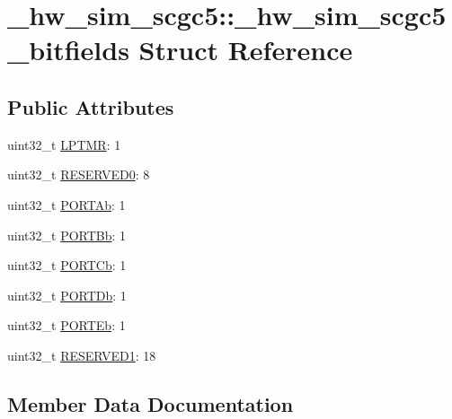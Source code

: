 \hypertarget{struct__hw__sim__scgc5_1_1__hw__sim__scgc5__bitfields}{}\section{\+\_\+hw\+\_\+sim\+\_\+scgc5\+:\+:\+\_\+hw\+\_\+sim\+\_\+scgc5\+\_\+bitfields Struct Reference}
\label{struct__hw__sim__scgc5_1_1__hw__sim__scgc5__bitfields}
\subsection*{Public Attributes}
\begin{DoxyCompactItemize}
\item 
uint32\+\_\+t \hyperlink{struct__hw__sim__scgc5_1_1__hw__sim__scgc5__bitfields_a6e91ec9ac9ff7921b8a2dde3bcb8b29f}{L\+P\+T\+MR}\+: 1
\item 
uint32\+\_\+t \hyperlink{struct__hw__sim__scgc5_1_1__hw__sim__scgc5__bitfields_a7d7472b4ef8a46343b99e8111f205aca}{R\+E\+S\+E\+R\+V\+E\+D0}\+: 8
\item 
uint32\+\_\+t \hyperlink{struct__hw__sim__scgc5_1_1__hw__sim__scgc5__bitfields_a94f07775ddf13563dddefc7bbe21ec55}{P\+O\+R\+T\+Ab}\+: 1
\item 
uint32\+\_\+t \hyperlink{struct__hw__sim__scgc5_1_1__hw__sim__scgc5__bitfields_ab241f201f88e0d698d4b098cc279f89e}{P\+O\+R\+T\+Bb}\+: 1
\item 
uint32\+\_\+t \hyperlink{struct__hw__sim__scgc5_1_1__hw__sim__scgc5__bitfields_a34cec11ef6ed61ea83d96840abe541d8}{P\+O\+R\+T\+Cb}\+: 1
\item 
uint32\+\_\+t \hyperlink{struct__hw__sim__scgc5_1_1__hw__sim__scgc5__bitfields_ab9027450aa4ebf1dd3cc4458eba0069d}{P\+O\+R\+T\+Db}\+: 1
\item 
uint32\+\_\+t \hyperlink{struct__hw__sim__scgc5_1_1__hw__sim__scgc5__bitfields_aa1b3050803269af1e224f54da99842f7}{P\+O\+R\+T\+Eb}\+: 1
\item 
uint32\+\_\+t \hyperlink{struct__hw__sim__scgc5_1_1__hw__sim__scgc5__bitfields_a4c8fd2ed4ec7eb1c7d5ff56ab39d72b0}{R\+E\+S\+E\+R\+V\+E\+D1}\+: 18
\end{DoxyCompactItemize}


\subsection{Member Data Documentation}
